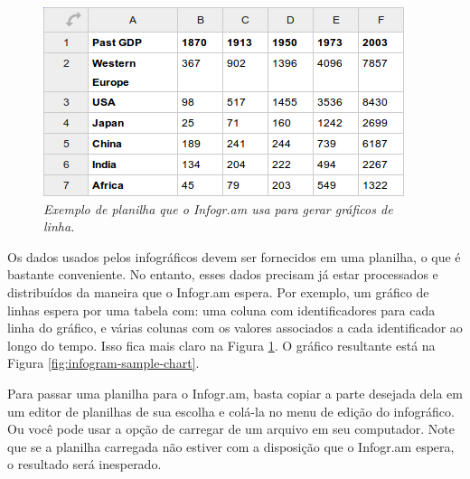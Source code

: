 \documentclass[12pt,onecolumn]{article}
\begin{document}
    \begin{figure}[ht]
      \centering
      \includegraphics[width=.9\linewidth]{infogram-sample-spreadsheet.png}
      \caption{
        \footnotesize
        \it
        Exemplo de planilha que o Infogr.am usa para gerar gráficos de linha.
      }
      \label{fig:infogram-sample-spreadsheet}
    \end{figure}
    
    Os dados usados pelos infográficos devem ser fornecidos em uma planilha, o que
    é bastante conveniente. No entanto, esses dados precisam já estar processados
    e distribuídos da maneira que o Infogr.am espera. Por exemplo, um gráfico de
    linhas espera por uma tabela com: uma coluna com identificadores para cada
    linha do gráfico, e várias colunas com os valores associados a cada
    identificador ao longo do tempo. Isso fica mais claro na Figura
    \ref{fig:infogram-sample-spreadsheet}. O gráfico resultante está na Figura
    \ref{fig:infogram-sample-chart}.
    
    Para passar uma planilha para o Infogr.am, basta copiar a parte desejada
    dela em um editor de planilhas de sua escolha e colá-la no menu de edição do
    infográfico. Ou você pode usar a opção de carregar de um arquivo em seu
    computador. Note que se a planilha carregada não estiver com a disposição
    que o Infogr.am espera, o resultado será inesperado.
    
\end{document}

